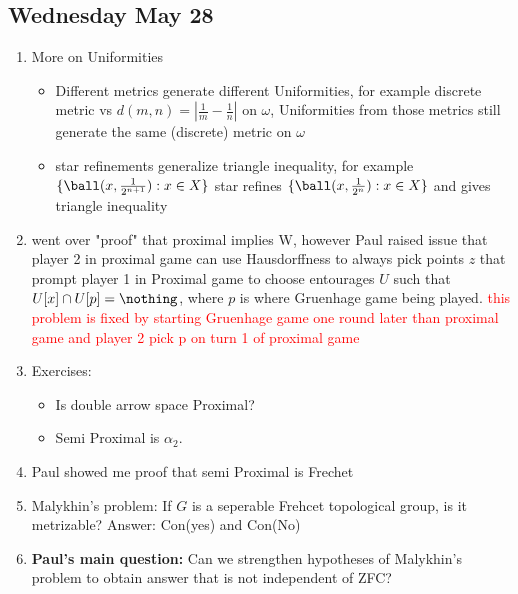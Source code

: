 \documentclass{article}
\begin{document}
\subsection*{Wednesday May 28}
\begin{enumerate}
    \item More on Uniformities 
    \begin{itemize}
        \item Different metrics generate different Uniformities, for example discrete metric vs \(d(m, n) = |\frac{1}{m} - \frac{1}{n}|\) on \(\omega\), Uniformities from those metrics still generate the same (discrete) metric on \(\omega\)
        \item star refinements generalize triangle inequality, for example \(\{\ball(x, \frac{1}{2^{n + 1}}): x \in X\}\) star refines \(\{\ball(x, \frac{1}{2^n}): x \in X\}\) and gives triangle inequality
    \end{itemize}
    \item went over "proof" that proximal implies W, however Paul raised issue that player 2 in proximal game can use Hausdorffness to always pick points \(z\) that prompt player 1 in Proximal game to choose entourages \(U\) such that \(U[x] \cap U[p] = \nothing\), where \(p\) is where Gruenhage game being played. \textcolor{red}{this problem is fixed by starting Gruenhage game one round later than proximal game and player 2 pick p on turn 1 of proximal game}
    \item Exercises:
    \begin{itemize}
        \item Is double arrow space Proximal?\checkmark
        \item Semi Proximal is \(\alpha_2\). \checkmark
    \end{itemize}
    \item Paul showed me proof that semi Proximal is Frechet
    \item Malykhin's problem: If \(G\) is a seperable Frehcet topological group, is it metrizable? Answer: Con(yes) and Con(No)
    \item \textbf{Paul's main question:} Can we strengthen hypotheses of Malykhin's problem to obtain answer that is not independent of ZFC?
\end{enumerate}
\end{document}
